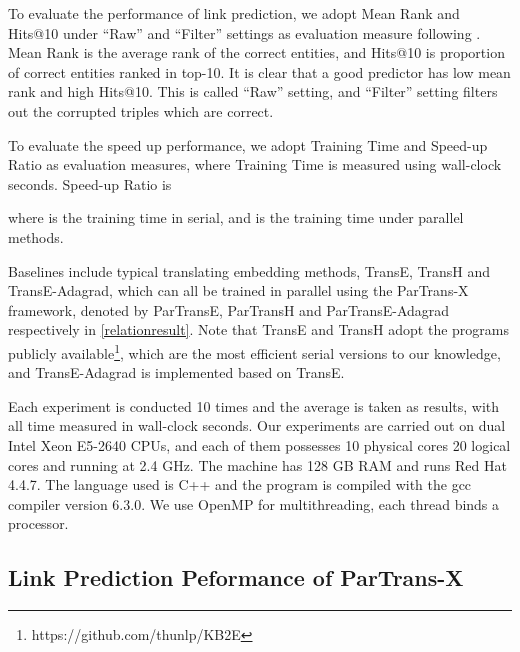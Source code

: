 \documentclass[sigconf]{acmart}
\begin{document}
To evaluate the performance of link prediction, we adopt Mean Rank and Hits@10 under ``Raw'' and ``Filter'' settings as evaluation measure following  \cite{bordes2013translating}. Mean Rank is the average rank of the correct entities, and Hits@10 is proportion of correct entities ranked in top-10. It is clear that a good predictor has low mean rank and high Hits@10.  
This is called ``Raw'' setting, and ``Filter'' setting filters out the corrupted triples which are correct. 

To evaluate the speed up performance, we adopt Training Time and Speed-up Ratio as evaluation measures, where Training Time is measured using wall-clock seconds. Speed-up Ratio is 
 
where  is the training time in serial, and  is the training time under parallel methods.




Baselines include typical translating embedding methods, TransE, TransH and TransE-Adagrad, which can all be trained in parallel using the ParTrans-X framework, denoted by ParTransE, ParTransH and ParTransE-Adagrad respectively in \tablename \ref{relationresult}.
Note that TransE  and TransH adopt the programs publicly available\footnote{https://github.com/thunlp/KB2E}, which are the most efficient serial versions to our knowledge, and TransE-Adagrad is implemented based on TransE. 




Each experiment is conducted 10 times and the average is taken as results, with all time measured in wall-clock seconds. Our experiments are carried out on dual Intel Xeon E5-2640 CPUs, and each of them possesses 10 physical cores 20 logical cores and running at 2.4 GHz.
The machine has 128 GB RAM and runs Red Hat 4.4.7.
The language used  is C++ and the program is compiled with the gcc compiler version 6.3.0. We use OpenMP for multithreading, each thread binds a processor.




















\subsection{Link Prediction Peformance of ParTrans-X}
\end{document}
